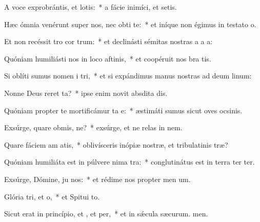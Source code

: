 \item A voce exprobrántis, et lotis:~* a fácie inimíci, et setis.
\item Hæc ómnia venérunt super nos, nec obti  te:~* et iníque non égimus in testato o.
\item Et non recéssit tro cor trum:~* et declinásti sémitas nostras a a a:
\item Quóniam humiliásti nos in loco aftinis,~* et coopéruit nos bra tis.
\item Si oblíti sumus nomen i tri,~* et si expándimus manus nostras ad deum linum:
\item Nonne Deus reret ta?~* ipse enim novit absdita dis.
\item Quóniam propter te mortificámur ta e:~* æstimáti sumus sicut oves ocsinis.
\item Exsúrge, quare obmis, ne?~* exsúrge, et ne relas in nem.
\item Quare fáciem am atis,~* oblivísceris inópiæ nostræ, et tribulatinis træ?
\item Quóniam humiliáta est in púlvere nima tra:~* conglutinátus est in terra ter ter.
\item Exsúrge, Dómine, ju nos:~* et rédime nos propter men um.
\item Glória tri, et o,~* et Spitui to.
\item Sicut erat in princípio, et , et per,~* et in sǽcula sæcurum. men.
